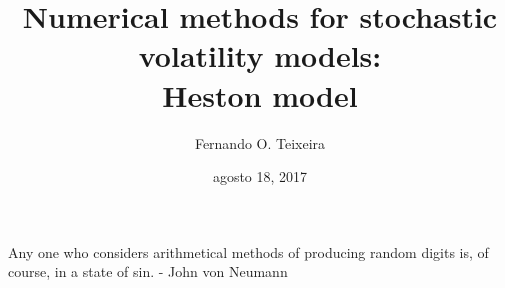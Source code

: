 \documentclass[12pt,twoside]{reedthesis}
\title{\textbf{\Huge{Numerical methods for stochastic volatility models: \\[20pt] Heston model}}}
\author{Fernando O. Teixeira}
\date{agosto 18, 2017}
\theoremstyle{definition}
\theoremstyle{definition}
\theoremstyle{remark}
\begin{document}
      \maketitle
  
  \frontmatter %
  \pagestyle{empty} %
      \begin{acknowledgements}
      Any one who considers arithmetical methods of producing random digits
      is, of course, in a state of sin. - John von Neumann
      \textbf{\\ \\ \\ \\ \\ \\ \\ \\ \\ \\ \\ \\ \\ \\ \\ \\ \\ \\ \\ \\ \\ \\ \\ \\ \\ \\ \\ \\ \\ \\ \\ \\ \\ \\ \\ \\ \\ \\ \\ \\ \\ \\ \\ \\ \\ \\ \\ \\ \\ \\ \\ \\ \\ \\ \\ \\ \\ \\ \\ \\ \\ \\ \\ }

\end{acknowledgements}
\end{document}
